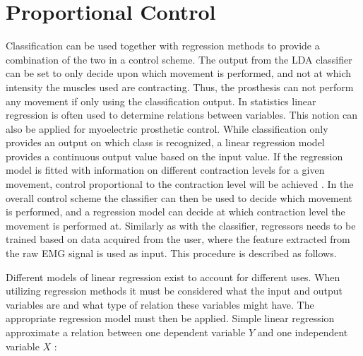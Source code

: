 \section{Proportional Control} \label{sec:BG:linearRegressionMethods}
Classification can be used together with regression methods to provide a combination of the two in a control scheme. The output from the LDA classifier can be set to only decide upon which movement is performed, and not
at which intensity the muscles used are contracting. Thus, the prosthesis can not perform any movement if only using the classification output.  In statistics linear regression is often used to determine relations between variables. This notion can also be applied for myoelectric prosthetic control. While classification only provides an output on which class is recognized, a linear regression model provides a continuous output value based on the input value. If the regression model is fitted with information on different contraction levels for a given movement, control proportional to the contraction level will be achieved \cite{Hwang2017, Hahne2014, Bruun2017}. In the overall control scheme the classifier can then be used to decide which movement is performed, and a regression model can decide at which contraction level the movement is performed at. Similarly as with the classifier, regressors needs to be trained based on data acquired from the user, where the feature extracted from the raw EMG signal is used as input. This procedure is described as follows. 

Different models of linear regression exist to account for different uses. When utilizing regression methods it must be considered what the input and output variables are and what type of relation these variables might have. The appropriate regression model must then be applied. Simple linear regression approximate a relation between one dependent variable $Y$ and one independent variable $X$ \cite{Zar2009}:


